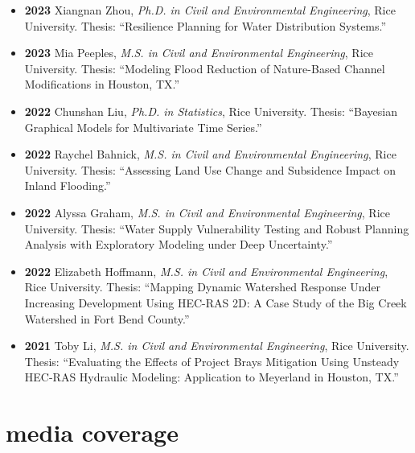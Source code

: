 \documentclass[10pt,oneside]{article}
\begin{document}
\begin{itemize}[label={}]
    \item \textbf{2023} \quad Xiangnan Zhou, \textit{Ph.D. in Civil and Environmental Engineering}, Rice University. Thesis: \enquote{Resilience Planning for Water Distribution Systems.}
  
    \item \textbf{2023} \quad Mia Peeples, \textit{M.S. in Civil and Environmental Engineering}, Rice University. Thesis: \enquote{Modeling Flood Reduction of Nature-Based Channel Modifications in Houston, TX.}
  
    \item \textbf{2022} \quad Chunshan Liu, \textit{Ph.D. in Statistics}, Rice University. Thesis: \enquote{Bayesian Graphical Models for Multivariate Time Series.}
  
    \item \textbf{2022} \quad Raychel Bahnick, \textit{M.S. in Civil and Environmental Engineering}, Rice University. Thesis: \enquote{Assessing Land Use Change and Subsidence Impact on Inland Flooding.}
  
    \item \textbf{2022} \quad Alyssa Graham, \textit{M.S. in Civil and Environmental Engineering}, Rice University. Thesis: \enquote{Water Supply Vulnerability Testing and Robust Planning Analysis with Exploratory Modeling under Deep Uncertainty.}
  
    \item \textbf{2022} \quad Elizabeth Hoffmann, \textit{M.S. in Civil and Environmental Engineering}, Rice University. Thesis: \enquote{Mapping Dynamic Watershed Response Under Increasing Development Using HEC-RAS 2D: A Case Study of the Big Creek Watershed in Fort Bend County.}
  
    \item \textbf{2021} \quad Toby Li, \textit{M.S. in Civil and Environmental Engineering}, Rice University. Thesis: \enquote{Evaluating the Effects of Project Brays Mitigation Using Unsteady HEC-RAS Hydraulic Modeling: Application to Meyerland in Houston, TX.}
  
\end{itemize}


\section{media coverage}

\mbox{}\vspace{-\dimexpr\baselineskip\relax}
\end{document}

